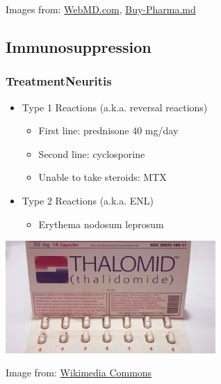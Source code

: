 \documentclass{beamer}
\begin{document}
\begin{frame}
\begin{center}
\begin{columns}
		\end{columns}
	\end{center}
	\tiny
		{
			Images from: \href{https://www.webmd.com/drugs/2/drug-1744/rifampin-oral/details}{WebMD.com}, \href{https://www.buy-pharma.md/img/uploads/4264-hansepran-generic-lamprene-clofazimine-100-mg-packaging.jpg}{Buy-Pharma.md}
		}
	\end{frame}
\subsection{Immunosuppression}
	\begin{frame}
		\frametitle{Treatment\textemdash Neuritis}
			\begin{itemize}
				\item Type 1 Reactions (a.k.a. reversal reactions)
					\begin{itemize}
						\item First line: prednisone 40 mg/day
						\item Second line: cyclosporine
						\item Unable to take steroids: MTX
					\end{itemize}
				\item Type 2 Reactions (a.k.a. ENL)
					\begin{itemize}
						\item Erythema nodosum leprosum
					\end{itemize}
			\end{itemize}
		\pause
		\begin{center}
			\includegraphics[width=0.6\textwidth,keepaspectratio]{thalidomide.jpg}
		\end{center}
		\tiny
			{
				Image from:
					\href{https://commons.wikimedia.org/wiki/File:Pack\_of\_Thalidomide\_tablets.jpg}{Wikimedia Commons}
			}
		\end{frame}
\end{document}
